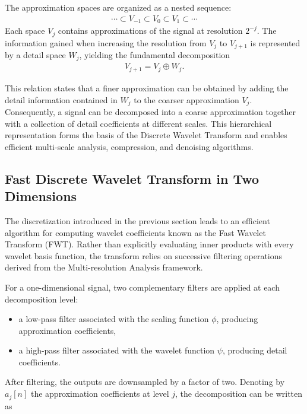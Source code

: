 The approximation spaces are organized as a nested sequence:
\begin{align}
\cdots \subset V_{-1}
\subset V_0
\subset V_1
\subset \cdots
\end{align}
Each space $V_j$ contains approximations of the signal at resolution $2^{-j}$. The information gained when increasing the resolution from $V_j$ to $V_{j+1}$ is represented by a detail space $W_j$, yielding the fundamental decomposition
\begin{align}
V_{j+1}
=
V_j \oplus W_j.
\end{align}

This relation states that a finer approximation can be obtained by adding the detail information contained in $W_j$ to the coarser approximation $V_j$. Consequently, a signal can be decomposed into a coarse approximation together with a collection of detail coefficients at different scales. This hierarchical representation forms the basis of the Discrete Wavelet Transform and enables efficient multi-scale analysis, compression, and denoising algorithms.



\subsection{Fast Discrete Wavelet Transform in Two Dimensions}

The discretization introduced in the previous section leads to an efficient algorithm for computing wavelet coefficients known as the Fast Wavelet Transform (FWT). Rather than explicitly evaluating inner products with every wavelet basis function, the transform relies on successive filtering operations derived from the Multi-resolution Analysis framework.

For a one-dimensional signal, two complementary filters are applied at each decomposition level:

\begin{itemize}
    \item a low-pass filter associated with the scaling function $\phi$, producing approximation coefficients,
    \item a high-pass filter associated with the wavelet function $\psi$, producing detail coefficients.
\end{itemize}

After filtering, the outputs are downsampled by a factor of two. Denoting by $a_j[n]$ the approximation coefficients at level $j$, the decomposition can be written as

